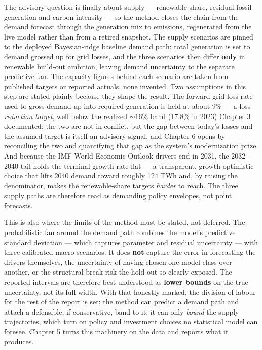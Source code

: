 \documentclass[10pt,twocolumn]{article}
\begin{document}
The advisory question is finally about supply --- renewable share, residual fossil generation and carbon intensity --- so the method closes the chain from the demand forecast through the generation mix to emissions, regenerated from the live model rather than from a retired snapshot. The supply scenarios are pinned to the deployed Bayesian-ridge baseline demand path: total generation is set to demand grossed up for grid losses, and the three scenarios then differ \textbf{only} in renewable build-out ambition, leaving demand uncertainty to the separate predictive fan. The capacity figures behind each scenario are taken from published targets or reported actuals, none invented. Two assumptions in this step are stated plainly because they shape the result. The forward grid-loss rate used to gross demand up into required generation is held at about 9\% --- a loss-\textit{reduction target}, well below the realized $\sim$16\% band (17.8\% in 2023) Chapter 3 documented; the two are not in conflict, but the gap between today's losses and the assumed target is itself an advisory signal, and Chapter 6 opens by reconciling the two and quantifying that gap as the system's modernization prize. And because the IMF World Economic Outlook drivers end in 2031, the 2032--2040 tail holds the terminal growth rate flat --- a transparent, growth-optimistic choice that lifts 2040 demand toward roughly 124 TWh and, by raising the denominator, makes the renewable-share targets \textit{harder} to reach. The three supply paths are therefore read as demanding policy envelopes, not point forecasts.

This is also where the limits of the method must be stated, not deferred. The probabilistic fan around the demand path combines the model's predictive standard deviation --- which captures parameter and residual uncertainty --- with three calibrated macro scenarios. It does \textbf{not} capture the error in forecasting the drivers themselves, the uncertainty of having chosen one model class over another, or the structural-break risk the hold-out so clearly exposed. The reported intervals are therefore best understood as \textbf{lower bounds} on the true uncertainty, not its full width. With that honestly marked, the division of labour for the rest of the report is set: the method can predict a demand path and attach a defensible, if conservative, band to it; it can only \textit{bound} the supply trajectories, which turn on policy and investment choices no statistical model can foresee. Chapter 5 turns this machinery on the data and reports what it produces.
\end{document}
